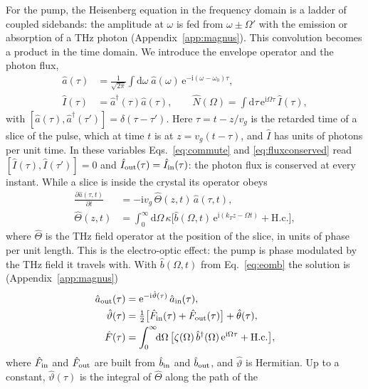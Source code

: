 \documentclass[aps,pra,reprint,superscriptaddress,amsmath,amssymb,floatfix]{revtex4-2}
\newcommand{\Nop}{\hat N}
\newcommand{\Iop}{\hat I}
\newcommand{\dd}{\mathrm{d}}
\newcommand{\ee}{\mathrm{e}}
\newcommand{\ii}{\mathrm{i}}
\begin{document}
For the pump, the Heisenberg equation in the frequency domain is a ladder of
coupled sidebands: the amplitude at $\omega$ is fed from $\omega\pm\Omega'$
with the emission or absorption of a THz photon
(Appendix~\ref{app:magnus}). This convolution becomes a product in the time
domain. We introduce the envelope operator and the photon flux,
\begin{align}
\hat a(\tau)&=\frac{1}{\sqrt{2\pi}}\int\!\dd\omega\;\hat a(\omega)\,
\ee^{-\ii(\omega-\omega_0)\tau},
\label{eq:envelope}\\
\Iop(\tau)&=\hat a^\dagger(\tau)\hat a(\tau),\qquad
\Nop(\Omega)=\int\!\dd\tau\,\ee^{\ii\Omega\tau}\,\Iop(\tau),
\label{eq:flux}
\end{align}
with $[\hat a(\tau),\hat a^\dagger(\tau')]=\delta(\tau-\tau')$. Here
$\tau=t-z/v_g$ is the retarded time of a slice of the pulse, which at time
$t$ is at $z=v_g(t-\tau)$, and $\Iop$ has units of photons per unit time. In
these variables Eqs.~\eqref{eq:commute} and \eqref{eq:fluxconserved} read
$[\Iop(\tau),\Iop(\tau')]=0$ and $\Iop_{\rm out}(\tau)=\Iop_{\rm in}(\tau)$: the
photon flux is conserved at every instant. While a slice is inside the
crystal its operator obeys
\begin{align}
\frac{\partial\hat a(\tau,t)}{\partial t}&=-\ii v_g\,\hat\Theta(z,t)\,\hat a(\tau,t),
\label{eq:eoma}\\
\hat\Theta(z,t)&=\int_0^\infty\!\!\dd\Omega\,\kappa
\big[\hat b(\Omega,t)\,\ee^{\ii(k_Tz-\Omega t)}+\mathrm{H.c.}\big],\nonumber
\end{align}
where $\hat\Theta$ is the THz field operator at the position of the slice, in
units of phase per unit length. This is the electro-optic effect: the pump is
phase modulated by the THz field it travels with. With $\hat b(\Omega,t)$ from
Eq.~\eqref{eq:eomb} the solution is (Appendix~\ref{app:magnus})
\begin{align}
\hat a_{\rm out}(\tau)&=\ee^{-\ii\hat\vartheta(\tau)}\,\hat a_{\rm in}(\tau),
\label{eq:phasemod}\\
\hat\vartheta(\tau)&=\tfrac12\big[\hat F_{\rm in}(\tau)+\hat F_{\rm out}(\tau)\big]
+\hat\theta(\tau),
\label{eq:theta}\\
\hat F(\tau)&=\int_0^\infty\!\!\dd\Omega\,\big[\zeta(\Omega)\,\hat b^\dagger(\Omega)\,
\ee^{\ii\Omega\tau}+\mathrm{H.c.}\big],
\label{eq:Fdef}
\end{align}
where $\hat F_{\rm in}$ and $\hat F_{\rm out}$ are built from $\hat b_{\rm in}$
and $\hat b_{\rm out}$, and $\hat\vartheta$ is Hermitian. Up to a constant,
$\hat\vartheta(\tau)$ is the integral of $\hat\Theta$ along the path of the
\end{document}
